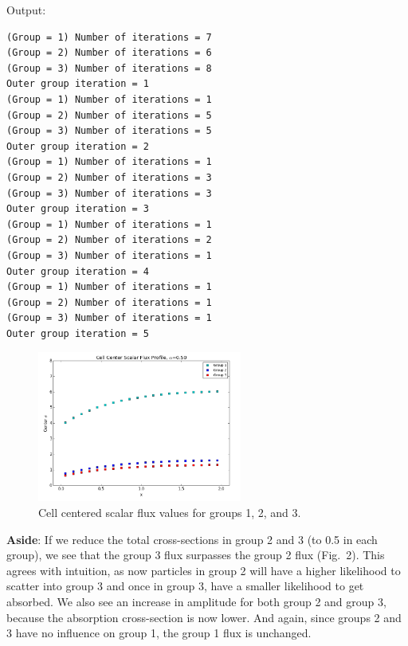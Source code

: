 \documentclass[10pt]{article}
\begin{document}


\vspace{10pt}
Output:
\begin{lstlisting}
(Group = 1) Number of iterations = 7
(Group = 2) Number of iterations = 6
(Group = 3) Number of iterations = 8
Outer group iteration = 1
(Group = 1) Number of iterations = 1
(Group = 2) Number of iterations = 5
(Group = 3) Number of iterations = 5
Outer group iteration = 2
(Group = 1) Number of iterations = 1
(Group = 2) Number of iterations = 3
(Group = 3) Number of iterations = 3
Outer group iteration = 3
(Group = 1) Number of iterations = 1
(Group = 2) Number of iterations = 2
(Group = 3) Number of iterations = 1
Outer group iteration = 4
(Group = 1) Number of iterations = 1
(Group = 2) Number of iterations = 1
(Group = 3) Number of iterations = 1
Outer group iteration = 5
\end{lstlisting}

\begin{figure}[H]
\centering
\includegraphics[width=0.6\textwidth]{Figures/groupcenterfluxes.png}
\vspace{-7pt}
\caption{Cell centered scalar flux values for groups 1, 2, and 3.}
\end{figure}

\textbf{Aside}: If we reduce the total cross-sections in group 2 and 3 (to 0.5 in each group), we see that the group 3 flux surpasses the group 2 flux (Fig.~2). This agrees with intuition, as now particles in group 2 will have a higher likelihood to scatter into group 3 and once in group 3, have a smaller likelihood to get absorbed. We also see an increase in amplitude for both group 2 and group 3, because the absorption cross-section is now lower. And again, since groups 2 and 3 have no influence on group 1, the group 1 flux is unchanged.
\end{document}
